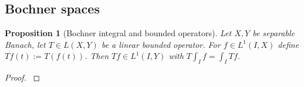 \documentclass[english,a4paper,9pt,oneside]{scrbook}	%
\theoremstyle{break}
\newtheorem{prop}[equation]{Proposition}
\newenvironment{mproof}[1][\proofname]{%
  \begin{proof}[#1]$ $\par\nobreak\ignorespaces
}{%
  \end{proof}
}
\renewcommand*{\proofname}{Proof}
\theoremstyle{remark}
\newcommand{\ds}{\displaystyle}
\newcommand{\cc}{\subset\subset}
\begin{document}
\begin{appendices}
%
%
%
%
%


\section{Bochner spaces}


\begin{prop}[Bochner integral and bounded operators]
\label{prop:bochner_bound}
Let $X,Y$ be separable Banach, let $T \in L(X,Y)$ be a linear bounded operator. For $f \in L^1(I,X)$ define $Tf (t):= T(f(t))$. Then $Tf \in L^1(I,Y)$ with $T\int_I f = \int_I Tf$.
\end{prop}
\begin{mproof}


\end{mproof}
\end{appendices}
\end{document}
